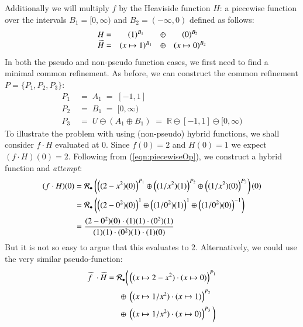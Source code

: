 Additionally we will multiply $f$ by the Heaviside function $H$: a piecewise function over the intervals
$B_1 = [0, \infty)$ and $B_2 = (-\infty, 0)$ defined as follows:
\begin{equation*}
	\begin{array}{r c c c}
		H			=& (1)^{B_1} 			&\oplus& 	(0)^{B_2} \\
		\,\pseudo{\!H} 	=& (x \mapsto 1)^{B_1}	&\oplus& 	(x \mapsto 0)^{B_2}
	\end{array}
\end{equation*}
In both the pseudo and non-pseudo function cases, we first need to find a minimal common refinement.
As before, we can construct the common refinement ${P = \{ P_1, P_2, P_3 \}}$:
\begin{align*}
	P_1 &\;=\; A_1 \;=\; [-1,1] \\
	P_2 &\;=\; B_1 \;=\;  [0, \infty) \\
	P_3 &\;=\; U \ominus (A_1 \oplus B_1) \;=\;  \mathbb{R} \ominus [-1,1] \ominus [0, \infty)
\end{align*}
To illustrate the problem with using (non-pseudo) hybrid functions, we shall consider $f\cdot H$ evaluated at 0. 
Since $f(0)=2$ and $H(0)=1$ we expect $(f\cdot H)(0)=2$.
Following from (\ref{eqn:piecewiseOp}), we construct a hybrid function and \emph{attempt}:
\begin{align*}
	(f \cdot H)(0) 
		&= \mathcal{R}_\bullet \left( 
			\left( (2-x^2)(0) \right)^{P_1} \oplus 
			\left( (1/x^2)(1) \right)^{P_2} \oplus 
			\left( (1/x^2)(0) \right)^{P_3} \right)(0) \\
		&= \mathcal{R}_\bullet \left( 
			\left( (2-0^2)(0) \right)^{1} \oplus 
			\left( (1/0^2)(1) \right)^{1} \oplus 
			\left( (1/0^2)(0) \right)^{-1} \right)\\
		& = \frac{(2-0^2)(0) \cdot (1)(1) \cdot (0^2)(1)}{(1)(1) \cdot (0^2)(1) \cdot (1)(0)}
\end{align*}
But it is not so easy to argue that this evaluates to 2.
Alternatively, we could use the very similar pseudo-function:
\begin{align*}
	\pseudo{f\;} \cdot \,\pseudo{\!H} = \mathcal{R}_\smallmult \bigg(
				& \left( (x \mapsto 2-x^2) \cdot (x \mapsto 0) \right)^{P_1} \notag \\
		\oplus \;& \left( (x \mapsto 1/x^2) \cdot (x \mapsto 1) \right)^{P_2} \notag \\
		\oplus \;& \left( (x \mapsto 1/x^2) \cdot (x \mapsto 0) \right)^{P_3} 
	\bigg)
\end{align*}


